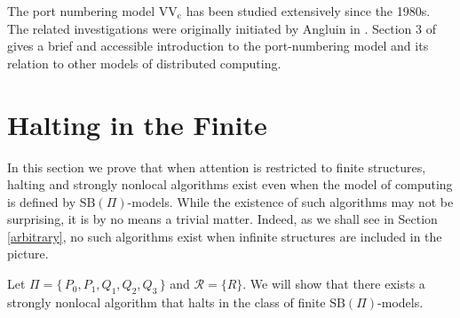 \documentclass[copyright,creativecommons]{eptcs}
\begin{document}
The port numbering model $\mathrm{VV_c}$ has been studied
extensively since the 1980s. The related investigations
were originally initiated by Angluin in \cite{angluin}.
Section 3 of \cite{hella2} gives a brief and accessible
introduction to the port-numbering model and
its relation to other models of distributed computing.








\begin{comment}
Let $\Pi$ be a finite set of proposition symbols. Let $\mathcal{C}$ be a class
of Kripke frames of the vocabulary $\Pi$, and assume that there exists some message passing
automaton $A$ of the vocabulary $\Pi$ that accepts a pointed $\Pi$-model $(M,w)$ iff
$(M,w)\in\mathcal{C}$. Then we say that $\mathcal{C}$ is $\mathrm{MPA}$-recognizable.
If $\mathcal{C}$ is $\mathrm{MPA}$-recognizable by a finite message passing automaton,
we say that $\mathcal{C}$ is $\mathrm{FMPA}$-recognizable. The class of exactly all $\mathrm{MPA}$-recognizable
classes of pointed models is denoted by MPA-Regular. The class of exactly all $\mathrm{FMPA}$-recognizable
classes of pointed models is denoted by FMPA-Regular. (Note that we do not limit attention to finite pointed models
here. The logical characterization results below hold with or without the restriction 
of attention to finite pointed models.)
\end{comment}








\section{Halting in the Finite}\label{finite}




In this section we prove that when 
attention is restricted to finite structures, halting
and strongly nonlocal algorithms exist
even when the model of computing is defined by $\mathrm{SB}(\Pi)$-models.
While the existence of such algorithms may not be surprising,
it is by no means a trivial matter. Indeed, as we shall see in Section \ref{arbitrary}\hspace{0.4mm},
no such algorithms exist when infinite structures are included in the picture. 





Let $\Pi = \{\, P_0,P_1,Q_1,Q_2,Q_3\, \}$ and $\mathcal{R} = \{R\}$.
We will show that there exists a
strongly nonlocal algorithm that halts in the class of finite $\mathrm{SB}(\Pi)$-models.
\end{document}
